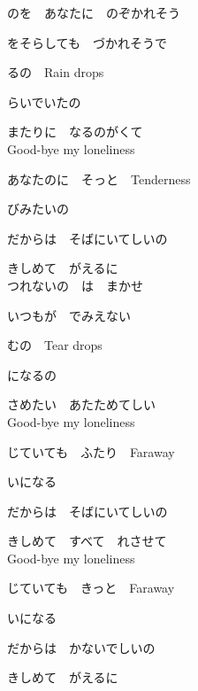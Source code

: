 \large{

のを　あなたに　のぞかれそう

をそらしても　づかれそうで

るの　Rain drops

らいでいたの

またりに　なるのがくて
\\

Good-bye my loneliness

あなたのに　そっと　Tenderness

びみたいの

だからは　そばにいてしいの

きしめて　がえるに
\\

つれないの　は　まかせ

いつもが　でみえない

むの　Tear drops

になるの

さめたい　あたためてしい
\\

Good-bye my loneliness

じていても　ふたり　Faraway

いになる

だからは　そばにいてしいの

きしめて　すべて　れさせて
\\

Good-bye my loneliness

じていても　きっと　Faraway

いになる

だからは　かないでしいの

きしめて　がえるに

}